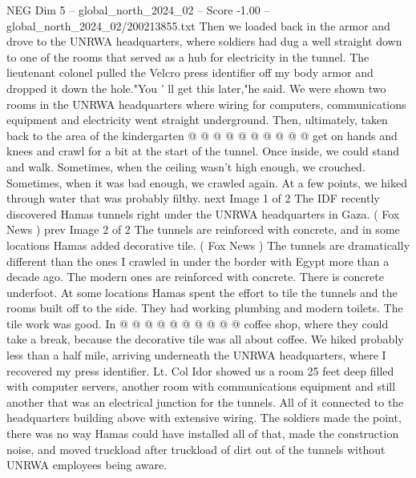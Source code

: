 \begin{textsample}{NEG Dim 5 – global\_north\_2024\_02 – Score -1.00 – global\_north\_2024\_02/200213855.txt}
Then we loaded back in the armor and drove to the UNRWA headquarters, where soldiers had dug a well straight down to one of the rooms that served as a hub for electricity in the tunnel.
The lieutenant colonel pulled the Velcro press identifier off my body armor and dropped it down the hole."You ' ll get this later,"he said.
We were shown two rooms in the UNRWA headquarters where wiring for computers, communications equipment and electricity went straight underground.
Then, ultimately, taken back to the area of the kindergarten @ @ @ @ @ @ @ @ @ @ get on hands and knees and crawl for a bit at the start of the tunnel.
Once inside, we could stand and walk.
Sometimes, when the ceiling wasn't high enough, we crouched.
Sometimes, when it was bad enough, we crawled again.
At a few points, we hiked through water that was probably filthy. next Image 1 of 2 The IDF recently discovered Hamas tunnels right under the UNRWA headquarters in Gaza. ( Fox News ) prev Image 2 of 2 The tunnels are reinforced with concrete, and in some locations Hamas added decorative tile. ( Fox News ) The tunnels are dramatically different than the ones I crawled in under the border with Egypt more than a decade ago.
The modern ones are reinforced with concrete.
There is concrete underfoot.
At some locations Hamas spent the effort to tile the tunnels and the rooms built off to the side.
They had working plumbing and modern toilets.
The tile work was good.
In @ @ @ @ @ @ @ @ @ @ coffee shop, where they could take a break, because the decorative tile was all about coffee.
We hiked probably less than a half mile, arriving underneath the UNRWA headquarters, where I recovered my press identifier.
Lt.
Col Idor showed us a room 25 feet deep filled with computer servers, another room with communications equipment and still another that was an electrical junction for the tunnels.
All of it connected to the headquarters building above with extensive wiring.
The soldiers made the point, there was no way Hamas could have installed all of that, made the construction noise, and moved truckload after truckload of dirt out of the tunnels without UNRWA employees being aware.

\end{textsample}
